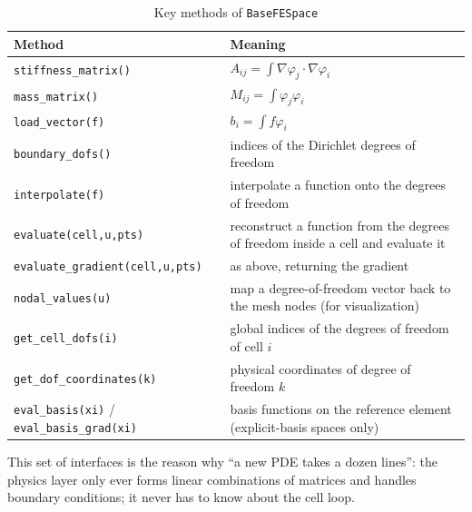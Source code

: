 \documentclass[11pt,oneside]{book}
\theoremstyle{definition}
\theoremstyle{plain}
\newenvironment{important}{%
  \begin{tcolorbox}[colback=blue!5,colframe=blue!45,title=Key Point,fonttitle=\bfseries]%
}{%
  \end{tcolorbox}%
}
\newcommand{\code}[1]{\texttt{#1}}
\begin{document}
\begin{table}[htbp]
\centering
\caption{Key methods of \code{BaseFESpace}}
\label{tab:space-api}
\begin{lrbox}{\guideTableBox}
\begin{tabular}{@{}L{6.2cm}L{9.2cm}@{}}
\toprule
Method & Meaning \\
\midrule
\code{stiffness\_\allowbreak matrix()} & $A_{ij}=\int\nabla\varphi_j\cdot\nabla\varphi_i$ \\
\code{mass\_\allowbreak matrix()} & $M_{ij}=\int\varphi_j\varphi_i$ \\
\code{load\_\allowbreak vector(f)} & $b_i=\int f\varphi_i$ \\
\code{boundary\_\allowbreak dofs()} & indices of the Dirichlet degrees of freedom \\
\code{interpolate(f)} & interpolate a function onto the degrees of freedom \\
\code{evaluate(cell,\allowbreak u,\allowbreak pts)} & reconstruct a function from the degrees of freedom inside a cell and evaluate it \\
\code{evaluate\_\allowbreak gradient(cell,\allowbreak u,\allowbreak pts)} & as above, returning the gradient \\
\code{nodal\_\allowbreak values(u)} & map a degree-of-freedom vector back to the mesh nodes (for visualization) \\
\code{get\_\allowbreak cell\_\allowbreak dofs(i)} & global indices of the degrees of freedom of cell $i$ \\
\code{get\_\allowbreak dof\_\allowbreak coordinates(k)} & physical coordinates of degree of freedom $k$ \\
\code{eval\_\allowbreak basis(xi)} / \code{eval\_\allowbreak basis\_\allowbreak grad(xi)} & basis functions on the reference element (explicit-basis spaces only) \\
\bottomrule
\end{tabular}
\end{lrbox}%
\ifdim\wd\guideTableBox>\linewidth
  \resizebox{\linewidth}{!}{\usebox{\guideTableBox}}%
\else\usebox{\guideTableBox}\fi
\end{table}

\begin{important}
This set of interfaces is the reason why ``a new PDE takes a dozen lines'': the
physics layer only ever forms linear combinations of matrices and handles boundary
conditions; it never has to know about the cell loop.
\end{important}
\end{document}
